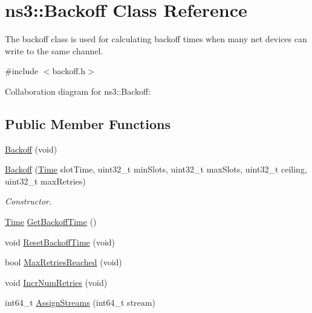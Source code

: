 \hypertarget{classns3_1_1Backoff}{}\section{ns3\+:\+:Backoff Class Reference}
\label{classns3_1_1Backoff}


The backoff class is used for calculating backoff times when many net devices can write to the same channel.  




{\ttfamily \#include $<$backoff.\+h$>$}



Collaboration diagram for ns3\+:\+:Backoff\+:
\subsection*{Public Member Functions}
\begin{DoxyCompactItemize}
\item 
\hyperlink{classns3_1_1Backoff_af39e9ddd21741927e45ff346b2fdb464}{Backoff} (void)
\item 
\hyperlink{classns3_1_1Backoff_a6307f5bf4a3ce8313f17fbcf12e4c113}{Backoff} (\hyperlink{classns3_1_1Time}{Time} slot\+Time, uint32\+\_\+t min\+Slots, uint32\+\_\+t max\+Slots, uint32\+\_\+t ceiling, uint32\+\_\+t max\+Retries)
\begin{DoxyCompactList}\small\item\em Constructor. \end{DoxyCompactList}\item 
\hyperlink{classns3_1_1Time}{Time} \hyperlink{classns3_1_1Backoff_ab805c5622b6c624d8d929be36ac6cc93}{Get\+Backoff\+Time} ()
\item 
void \hyperlink{classns3_1_1Backoff_a103dc910a4f81c7444e873be3d055237}{Reset\+Backoff\+Time} (void)
\item 
bool \hyperlink{classns3_1_1Backoff_a273e3444ab023da993742d4bdd72e982}{Max\+Retries\+Reached} (void)
\item 
void \hyperlink{classns3_1_1Backoff_af0b4605876aeb05e9cf1a90acf6b5f86}{Incr\+Num\+Retries} (void)
\item 
int64\+\_\+t \hyperlink{classns3_1_1Backoff_a5227e2034c6a5b54fd3ea59ed2be2c93}{Assign\+Streams} (int64\+\_\+t stream)
\end{DoxyCompactItemize}
